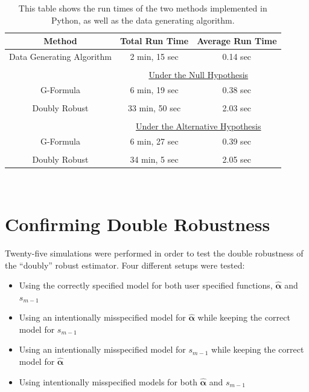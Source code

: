 \begin{table}[h!]
\centering
\begin{tabular}{c | c c }
Method & Total Run Time & Average Run Time\\
\hline 
Data Generating Algorithm & 2 min, 15 sec & 0.14 sec\\ \\ 
& \multicolumn{2}{c}{\underline{Under the Null Hypothesis}} \\
G-Formula & 6 min, 19 sec & 0.38 sec \\ \\ 
Doubly Robust & 33 min, 50 sec & 2.03 sec\\ \\ 
& \multicolumn{2}{c}{\underline{Under the Alternative Hypothesis}} \\
G-Formula & 6 min, 27 sec & 0.39 sec\\ \\ 
Doubly Robust & 34 min, 5 sec & 2.05 sec
\end{tabular} \\
\centering
\caption[Run times of simulations]{This table shows the run times of the two methods implemented in Python, as well as the data generating algorithm. \label{runtimes}}
\end{table}


\section{Confirming Double Robustness} \label{doublerobust}
Twenty-five simulations were performed in order to test the double robustness of the ``doubly'' robust estimator.  Four different setups were tested: 
\begin{itemize} 
\item Using the correctly specified model for both user specified functions, $\hat{\mathbf{\alpha}}$ and $s_{m-1}$ 
\item Using an intentionally misspecified model for $\hat{\mathbf{\alpha}}$ while keeping the correct model for $s_{m-1}$ 
\item Using an intentionally misspecified model for $s_{m-1}$ while keeping the correct model for $\hat{\mathbf{\alpha}}$
\item Using intentionally misspecified models for both $\hat{\mathbf{\alpha}}$ and $s_{m-1}$ 
\end{itemize} 

